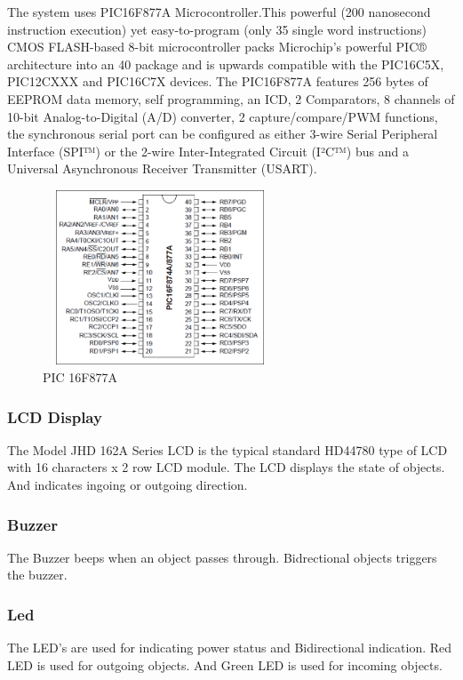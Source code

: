 \documentclass[conference]{IEEEtran}
\begin{document}
The system uses PIC16F877A Microcontroller.This powerful (200 nanosecond instruction execution) yet easy-to-program (only 35 single word instructions) CMOS FLASH-based 8-bit microcontroller packs Microchip's powerful PIC® architecture into an 40 package and is upwards compatible with the PIC16C5X, PIC12CXXX and PIC16C7X devices. The PIC16F877A features 256 bytes of EEPROM data memory, self programming, an ICD, 2 Comparators, 8 channels of 10-bit Analog-to-Digital (A/D) converter, 2 capture/compare/PWM functions, the synchronous serial port can be configured as either 3-wire Serial Peripheral Interface (SPI™) or the 2-wire Inter-Integrated Circuit (I²C™) bus and a Universal Asynchronous Receiver Transmitter (USART).
\begin{figure}[H]
  \includegraphics[width=7cm, height=5.2cm]{PIC16F877A-Pinout.png}
  \caption{PIC 16F877A}
\centering
  \label{PIC}
\end{figure}



\subsubsection{LCD Display}

The Model JHD 162A Series LCD is the typical standard HD44780 type of LCD with 16 characters x 2 row LCD module. The LCD displays the state of objects. And indicates ingoing or outgoing direction.

\hfil
\subsubsection{Buzzer}
The Buzzer beeps when an object passes through. Bidrectional objects triggers the buzzer.

\hfil
\subsubsection{Led}
The LED's are used for indicating power status and Bidirectional indication. Red LED is used for outgoing objects. And Green LED is used for incoming objects.
\end{document}
